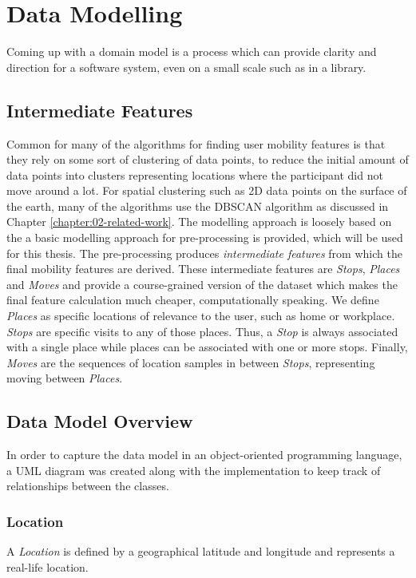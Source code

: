 \section{Data Modelling}
Coming up with a domain model is a process which can provide clarity and direction for a software system, even on a small scale such as in a library. 

\subsection{Intermediate Features}
Common for many of the algorithms for finding user mobility features is that they rely on some sort of clustering of data points, to reduce the initial amount of data points into clusters representing locations where the participant did not move around a lot. For spatial clustering such as 2D data points on the surface of the earth, many of the algorithms use the DBSCAN algorithm as discussed in Chapter \ref{chapter:02-related-work}. The modelling approach is loosely based on the \cite{sparse-location-2014} a basic modelling approach for pre-processing is provided, which will be used for this thesis. The pre-processing produces \textit{intermediate features} from which the final mobility features are derived. These intermediate features are \textit{Stops}, \textit{Places} and \textit{Moves} and provide a course-grained version of the dataset which makes the final feature calculation much cheaper, computationally speaking. We define \textit{Places} as specific locations of relevance to the user, such as home or workplace. \textit{Stops} are specific visits to any of those places. Thus, a \textit{Stop} is always associated with a single place while places can be associated with one or more stops. Finally, \textit{Moves} are the sequences of location samples in between \textit{Stops}, representing moving between \textit{Places}. 

\subsection{Data Model Overview}
In order to capture the data model in an object-oriented programming language, a UML diagram was created along with the implementation to keep track of relationships between the classes. 

\subsubsection*{Location}
A \textit{Location} is defined by a geographical latitude and longitude and represents a real-life location.


